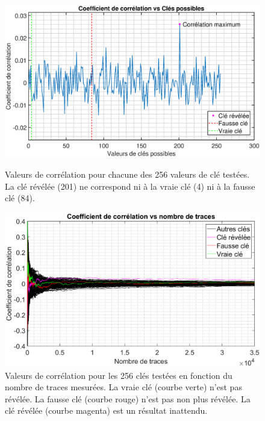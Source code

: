 \documentclass[oneside]{book}
\begin{document}
\begin{figure}[htbp]
    \hspace{-1.8cm}
    \includegraphics[scale=0.57]{image/real_trace_faking_sequentielle_corr_vs_cles}
    \caption{Valeurs de corrélation pour chacune des 256 valeurs de clé testées. La clé révélée (201) ne correspond ni à la vraie clé (4) ni à la fausse clé (84).}
    \label{fig:real_trace_faking_sequentielle_corr_vs_cles} 
    \hspace{-1.8cm}
    \includegraphics[scale=0.6]{image/real_trace_faking_sequentielle_corr_vs_nb_traces}
    \caption{Valeurs de corrélation pour les 256 clés testées en fonction du nombre de traces mesurées. La vraie clé (courbe verte) n'est pas révélée. La fausse clé (courbe rouge) n'est pas non plus révélée. La clé révélée (courbe magenta) est un résultat inattendu.}
    \label{fig:real_trace_faking_sequentielle_corr_vs_nb_traces} 
\end{figure}
\end{document}
